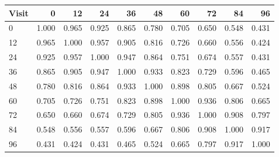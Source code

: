 \small
\begin{tabular}{lrrrrrrrrr}
\hline
Visit & 0 & 12 & 24 & 36 & 48 & 60 & 72 & 84 & 96 \\
\hline
0 & 1.000 & 0.965 & 0.925 & 0.865 & 0.780 & 0.705 & 0.650 & 0.548 & 0.431 \\
12 & 0.965 & 1.000 & 0.957 & 0.905 & 0.816 & 0.726 & 0.660 & 0.556 & 0.424 \\
24 & 0.925 & 0.957 & 1.000 & 0.947 & 0.864 & 0.751 & 0.674 & 0.557 & 0.431 \\
36 & 0.865 & 0.905 & 0.947 & 1.000 & 0.933 & 0.823 & 0.729 & 0.596 & 0.465 \\
48 & 0.780 & 0.816 & 0.864 & 0.933 & 1.000 & 0.898 & 0.805 & 0.667 & 0.524 \\
60 & 0.705 & 0.726 & 0.751 & 0.823 & 0.898 & 1.000 & 0.936 & 0.806 & 0.665 \\
72 & 0.650 & 0.660 & 0.674 & 0.729 & 0.805 & 0.936 & 1.000 & 0.908 & 0.797 \\
84 & 0.548 & 0.556 & 0.557 & 0.596 & 0.667 & 0.806 & 0.908 & 1.000 & 0.917 \\
96 & 0.431 & 0.424 & 0.431 & 0.465 & 0.524 & 0.665 & 0.797 & 0.917 & 1.000 \\
\hline
\end{tabular}
